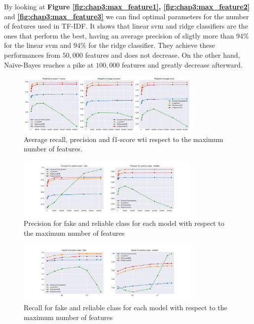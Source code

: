 By looking at \textbf{Figure \ref{fig:chap3:max_feature1}, \ref{fig:chap3:max_feature2}} and \textbf{\ref{fig:chap3:max_feature3}} we can find optimal parameters for the number of features used in TF-IDF. It shows that linear svm and ridge classifiers are the ones that perform the best, having an average precision of sligtly more than $94\%$ for the linear svm and $94\%$ for the ridge classifier. They achieve these performances from $50,000$ features and does not decrease. On the other hand, Na\"{i}ve-Bayes reaches a pike at $100,000$ features and greatly decrease afterward. \\
\begin{figure}
 \centering
 \includegraphics[width=0.8\textwidth]{images/chapitre3/ML_fake_average}
 \caption{Average recall, precision and f1-score wti respect to the maximum number of features.}
 \label{fig:chap3:max_feat1}
\end{figure}
\begin{figure}
 \centering
 \includegraphics[width=0.8\textwidth]{images/chapitre3/ML_fake_precision}
 \caption{Precision for fake and reliable class for each model with respect to the maximum number of features}
 \label{fig:chap3:max_feat2}
\end{figure}
\begin{figure}
 \centering
 \includegraphics[width=0.8\textwidth]{images/chapitre3/ML_fake_recall}
 \caption{Recall for fake and reliable class for each model with respect to the maximum number of features}
 \label{fig:chap3:max_feat3}
\end{figure}

